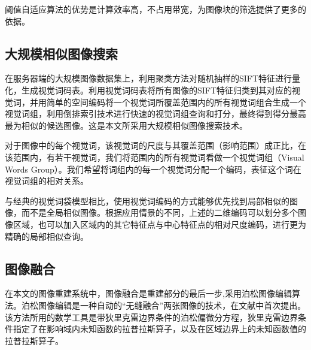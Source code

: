 \documentclass[UTF8]{csoarticle}
\begin{document}
阈值自适应算法的优势是计算效率高，不占用带宽，为图像块的筛选提供了更多的依据。

\subsection{大规模相似图像搜索}

在服务器端的大规模图像数据集上，利用聚类方法对随机抽样的SIFT特征进行量化，生成视觉词码表。利用视觉词码表将所有图像的SIFT特征归类到其对应的视觉词，并用简单的空间编码将一个视觉词所覆盖范围内的所有视觉词组合生成一个视觉词组，利用倒排索引技术进行快速的视觉词组查询和打分，最终得到得分最高最为相似的候选图像。这是本文所采用大规模相似图像搜索技术。

对于图像中的每个视觉词，该视觉词的尺度与其覆盖范围（影响范围）成正比，在该范围内，有若干视觉词，我们将范围内的所有视觉词看做一个视觉词组（Visual Words Group）。我们希望将词组内的每一个视觉词分配一个编码，表征这个词在视觉词组的相对关系。






与经典的视觉词袋模型相比，使用视觉词编码的方式能够优先找到局部相似的图像，而不是全局相似图像。根据应用情景的不同，上述的二维编码可以划分多个图像区域，也可以加入区域内的其它特征点与中心特征点的相对尺度编码，进行更为精确的局部相似查询。

\subsection{图像融合}
在本文的图像重建系统中，图像融合是重建部分的最后一步,采用泊松图像编辑算法。泊松图像编辑是一种自动的“无缝融合”两张图像的技术，在文献\cite{Perez:2003ul}中首次提出。该方法所用的数学工具是带狄里克雷边界条件的泊松偏微分方程，狄里克雷边界条件指定了在影响域内未知函数的拉普拉斯算子，以及在区域边界上的未知函数值的拉普拉斯算子。
\end{document}
